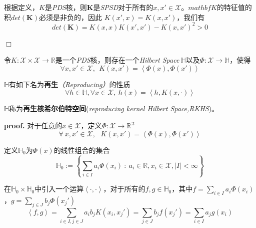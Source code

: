 根据定义，$K$是\textsl{PDS}核，则$\mathbf{K}$是\textsl{SPSD}对于所有的$x,x'\in \mathcal{X}$。$mathbf{K}$的特征值的积$det(\mathbf{K})$必须是非负的，因此
$K(x',x)=K(x,x')$，我们有
\begin{equation}
    det(\mathbf{K})=K(x,x)K(x',x')-K(x,x')^2>0
\end{equation}

$\Box$

\begin{mdframed}
    \begin{theorem}
        令$K:\mathcal{X}\times \mathcal{X}\rightarrow \mathbb{R}$是一个\textsl{PDS}核，则存在一个\textsl{Hilbert Space}$\ \mathbb{H}$以及$\Phi:\mathcal{X}\rightarrow \mathbb{H}$，使得
        \begin{equation}
            \forall x,x'\in \mathcal{X},\ \ K(x,x')=\left<\Phi(x),\Phi(x')\right>
        \end{equation}

        $\mathbb{H}$有如下名为\textbf{再生}\textsl{（Reproducing）}的性质
        \begin{equation}
            \forall h\in \mathbb{H},\forall x\in \mathcal{X},\ h(x)=\left< h,K(x,\cdot) \right>
        \end{equation}

        $\mathbb{H}$称为\textbf{再生核希尔伯特空间}(\textsl{reproducing kernel Hilbert Space,RKHS})。
    \end{theorem}
\end{mdframed}

\textbf{proof.}\hspace{1em} 对于任意的$x\in \mathcal{X}$，定义$\Phi:\mathcal{X}\rightarrow \mathbb{R}^\mathcal{X}$
\begin{equation}
    \forall\ x,x'\in \mathcal{X},\ \ \ K(x,x')=\left< \Phi(x),\Phi(x') \right>
\end{equation}

定义$\mathbb{H}_0$为$\Phi(x)$的线性组合的集合
\begin{equation}
    \mathbb{H}_0:=\left\{ \sum_{i\in I}a_i\Phi(x_i)\ :\ a_i\in \mathbb{R},x_i\in \mathcal{X},|I|<\infty \right\}
\end{equation}

在$\mathbb{H}_0\times \mathbb{H}_0$中引入一个运算$\left< \cdot,\cdot \right>$，对于所有的$f,g\in \mathbb{H}_0$，其中$f=\sum_{i\in I} a_i\Phi(x_i)$，$g=\sum_{j\in J} b_j\Phi(x_j')$
\begin{equation}
    \left<f,g\right>=\sum_{i\in I,j\in J} a_i b_j K(x_i,x_j')=\sum_{j\in J}b_j f(x_j')=\sum_{i\in I}a_j g(x_i)
\end{equation}

